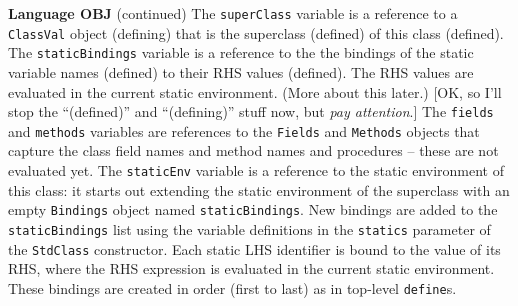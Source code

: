 \begin{minipage}[t]{\sw}
\slidenumber
\LARGE
{\bf Language OBJ} (continued)\exx
The \verb'superClass' variable is a reference
to a \verb'ClassVal' object (defining)
that is the superclass (defined) of this class (defined).
The \verb'staticBindings' variable is a reference
to the the bindings of the static variable names (defined)
to their RHS values (defined).
The RHS values are evaluated in the current static environment.
(More about this later.)
[OK, so I'll stop the ``(defined)'' and ``(defining)'' stuff now,
but {\em pay attention}.]\exx
The \verb'fields' and \verb'methods' variables are references
to the \verb'Fields' and \verb'Methods' objects
that capture the class field names
and method names
and procedures -- these are not evaluated yet.\exx
The \verb'staticEnv' variable is a reference
to the static environment of this class:
it starts out extending the static environment of the superclass
with an empty \verb'Bindings' object named \verb'staticBindings'.
New bindings are added to the \verb'staticBindings' list
using the variable definitions
in the \verb'statics' parameter of the \verb'StdClass' constructor.
Each static LHS identifier is bound to the value of its RHS,
where the RHS expression is evaluated in the current static environment.
These bindings are created in order (first to last)
as in top-level \verb'define's.\exx
\end{minipage}
